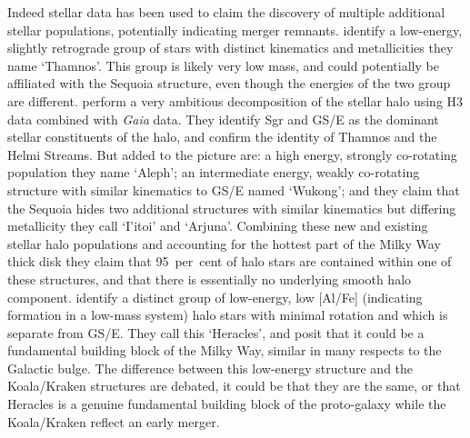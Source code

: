 Indeed stellar data has been used to claim the discovery of multiple additional stellar populations, potentially indicating merger remnants. \textcite{koppelman19b} identify a low-energy, slightly retrograde group of stars with distinct kinematics and metallicities they name `Thamnos'. This group is likely very low mass, and could potentially be affiliated with the Sequoia structure, even though the energies of the two group are different. \textcite{naidu20} perform a very ambitious decomposition of the stellar halo using H3 data combined with \textit{Gaia} data. They identify Sgr and GS/E as the dominant stellar constituents of the halo, and confirm the identity of Thamnos and the Helmi Streams. But added to the picture are: a high energy, strongly co-rotating population they name `Aleph'; an intermediate energy, weakly co-rotating structure with similar kinematics to GS/E named `Wukong'; and they claim that the Sequoia hides two additional structures with similar kinematics but differing metallicity they call `I'itoi' and `Arjuna'. Combining these new and existing stellar halo populations and accounting for the hottest part of the Milky Way thick disk they claim that 95~per~cent of halo stars are contained within one of these structures, and that there is essentially no underlying smooth halo component. \textcite{horta21a} identify a distinct group of low-energy, low [Al/Fe] (indicating formation in a low-mass system) halo stars with minimal rotation and which is separate from GS/E. They call this `Heracles', and posit that it could be a fundamental building block of the Milky Way, similar in many respects to the Galactic bulge. The difference between this low-energy structure and the Koala/Kraken structures are debated, it could be that they are the same, or that Heracles is a genuine fundamental building block of the proto-galaxy while the Koala/Kraken reflect an early merger.

